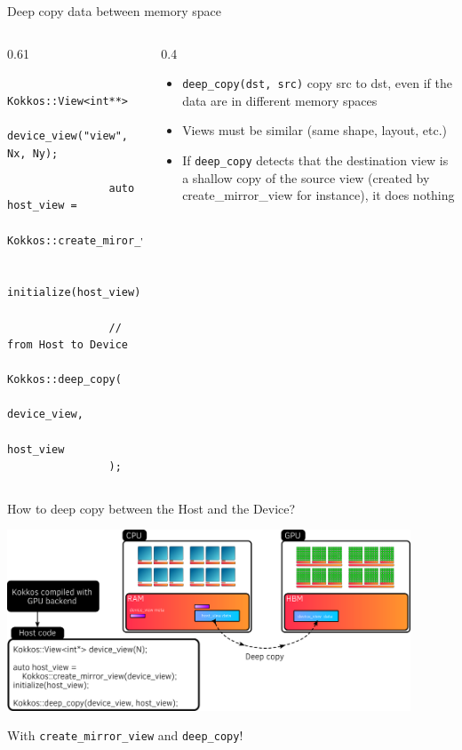 \documentclass[
    aspectratio=169,
    handout,
]{beamer}
\begin{document}
\begin{frame}[fragile]{Deep copy data between memory space}
    \begin{columns} %
        \begin{column}{0.61\linewidth}
            \begin{verbatim}
                Kokkos::View<int**>
                    device_view("view", Nx, Ny);

                auto host_view =
                    Kokkos::create_miror_view(device_view);

                initialize(host_view);

                // from Host to Device
                Kokkos::deep_copy(
                    device_view,
                    host_view
                );
            \end{verbatim}
        \end{column}
        \begin{column}{0.4\linewidth}
            \begin{itemize}
                \item \texttt{deep\_copy(dst, src)} copy src to dst, even if the data are in different memory spaces
                \item Views must be similar (same shape, layout, etc.)
                \item If \texttt{deep\_copy} detects that the destination view is a shallow copy of the source view (created by create\_mirror\_view for instance), it does nothing
            \end{itemize}
        \end{column}
    \end{columns}
\end{frame}


\begin{frame}{How to deep copy between the Host and the Device?}
    \begin{center}
        \includegraphics[width=0.9\textwidth]{host_device_deep_copy.png}
    \end{center}

     With \texttt{create\_mirror\_view} and \texttt{deep\_copy}!
\end{frame}
\end{document}
